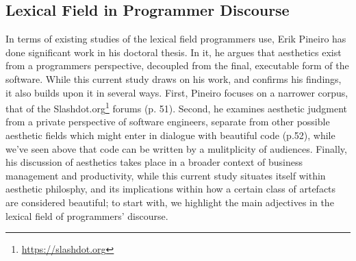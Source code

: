 \subsection{Lexical Field in Programmer Discourse} %


In terms of existing studies of the lexical field programmers use, Erik Pineiro has done significant work in his doctoral thesis. In it, he argues that aesthetics exist from a programmers perspective, decoupled from the final, executable form of the software. While this current study draws on his work, and confirms his findings, it also builds upon it in several ways. First, Pineiro focuses on a narrower corpus, that of the Slashdot.org\footnote{\url{https://slashdot.org}} forums\cite{pineiro_aesthetics_2003} (p. 51). Second, he examines aesthetic judgment from a private perspective of software engineers, separate from other possible aesthetic fields which might enter in dialogue with beautiful code\cite{pineiro_aesthetics_2003} (p.52), while we've seen above that code can be written by a mulitplicity of audiences. Finally, his discussion of aesthetics takes place in a broader context of business management and productivity, while this current study situates itself within aesthetic philosphy, and its implications within how a certain class of artefacts are considered beautiful; to start with, we highlight the main adjectives in the lexical field of programmers' discourse.

\vspace*{1\baselineskip}

